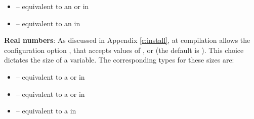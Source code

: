 \begin{itemize}
\item {} 
 -- equivalent to an  or  in {\F}

\item {} 
 -- equivalent to an  in {\F}
\end{itemize}

\textbf{Real numbers}:  As discussed in Appendix \ref{c:install}, at compilation
{\sundials} allows the configuration option ,
that accepts values of ,  or  (the
default is ).  This choice dictates the size of a
 variable.  The corresponding {\F} types for these
 sizes are:
\begin{itemize}
\item {} 
 -- equivalent to a  or  in {\F}

\item {} 
 -- equivalent to a  or  in {\F}

\item {} 
 -- equivalent to a  in {\F}

\end{itemize}

